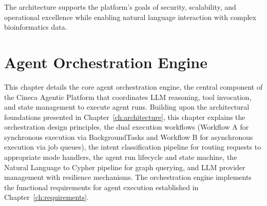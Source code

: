 \documentclass[a4paper,twoside]{sapthesis}
\begin{document}
The architecture supports the platform's goals of security, scalability, and operational excellence while enabling natural language interaction with complex bioinformatics data.


\chapter{Agent Orchestration Engine}
\label{ch:orchestration}

%

This chapter details the core agent orchestration engine, the central component of the Cineca Agentic Platform that coordinates LLM reasoning, tool invocation, and state management to execute agent runs. Building upon the architectural foundations presented in Chapter~\ref{ch:architecture}, this chapter explains the orchestration design principles, the dual execution workflows (Workflow A for synchronous execution via BackgroundTasks and Workflow B for asynchronous execution via job queues), the intent classification pipeline for routing requests to appropriate mode handlers, the agent run lifecycle and state machine, the Natural Language to Cypher pipeline for graph querying, and LLM provider management with resilience mechanisms. The orchestration engine implements the functional requirements for agent execution established in Chapter~\ref{ch:requirements}.
\end{document}
